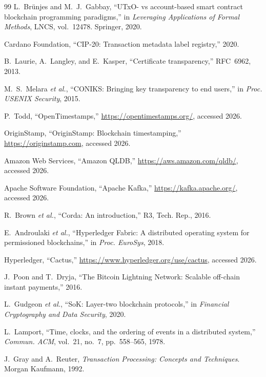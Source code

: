 \documentclass[journal]{IEEEtran}
\begin{document}
\begin{thebibliography}{99}
L.~Br\"{u}njes and M.~J.~Gabbay, ``UTxO- vs account-based smart contract blockchain programming paradigms,'' in \emph{Leveraging Applications of Formal Methods}, LNCS, vol.~12478. Springer, 2020.

Cardano Foundation, ``CIP-20: Transaction metadata label registry,'' 2020.

B.~Laurie, A.~Langley, and E.~Kasper, ``Certificate transparency,'' RFC~6962, 2013.

M.~S.~Melara \emph{et al.}, ``CONIKS: Bringing key transparency to end users,'' in \emph{Proc. USENIX Security}, 2015.

P.~Todd, ``OpenTimestamps,'' \url{https://opentimestamps.org/}, accessed 2026.

OriginStamp, ``OriginStamp: Blockchain timestamping,'' \url{https://originstamp.com}, accessed 2026.

Amazon Web Services, ``Amazon QLDB,'' \url{https://aws.amazon.com/qldb/}, accessed 2026.

Apache Software Foundation, ``Apache Kafka,'' \url{https://kafka.apache.org/}, accessed 2026.

R.~Brown \emph{et al.}, ``Corda: An introduction,'' R3, Tech. Rep., 2016.

E.~Androulaki \emph{et al.}, ``Hyperledger Fabric: A distributed operating system for permissioned blockchains,'' in \emph{Proc. EuroSys}, 2018.

Hyperledger, ``Cactus,'' \url{https://www.hyperledger.org/use/cactus}, accessed 2026.

J.~Poon and T.~Dryja, ``The Bitcoin Lightning Network: Scalable off-chain instant payments,'' 2016.

L.~Gudgeon \emph{et al.}, ``SoK: Layer-two blockchain protocols,'' in \emph{Financial Cryptography and Data Security}, 2020.

L.~Lamport, ``Time, clocks, and the ordering of events in a distributed system,'' \emph{Commun. ACM}, vol.~21, no.~7, pp.~558--565, 1978.

J.~Gray and A.~Reuter, \emph{Transaction Processing: Concepts and Techniques}. Morgan Kaufmann, 1992.


\end{thebibliography}
\end{document}
